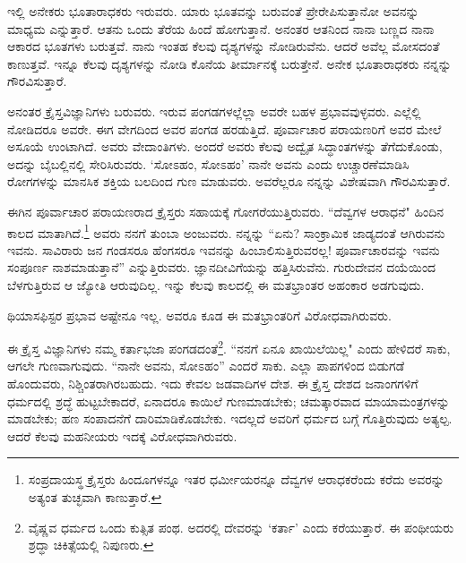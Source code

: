 \vspace{0.13cm}

ಇಲ್ಲಿ ಅನೇಕರು ಭೂತಾರಾಧಕರು ಇರುವರು. ಯಾರು ಭೂತವನ್ನು ಬರುವಂತೆ ಪ್ರೇರೇಪಿಸುತ್ತಾನೋ ಅವನನ್ನು ಮಾಧ್ಯಮ ಎನ್ನುತ್ತಾರೆ. ಆತನು ಒಂದು ತೆರೆಯ ಹಿಂದೆ ಹೋಗುತ್ತಾನೆ. ಅನಂತರ ಆತನಿಂದ ನಾನಾ ಬಣ್ಣದ ನಾನಾ ಆಕಾರದ ಭೂತಗಳು ಬರುತ್ತವೆ. ನಾನು ಇಂತಹ ಕೆಲವು ದೃಶ್ಯಗಳನ್ನು ನೋಡಿರುವೆನು. ಆದರೆ ಅವೆಲ್ಲ ಮೋಸದಂತೆ ಕಾಣುತ್ತವೆ. ಇನ್ನೂ ಕೆಲವು ದೃಶ್ಯಗಳನ್ನು ನೋಡಿ ಕೊನೆಯ ತೀರ್ಮಾನಕ್ಕೆ ಬರುತ್ತೇನೆ. ಅನೇಕ ಭೂತಾರಾಧಕರು ನನ್ನನ್ನು ಗೌರವಿಸುತ್ತಾರೆ.

\vspace{0.13cm}

ಅನಂತರ ಕ್ರೈಸ್ತವಿಜ್ಞಾನಿಗಳು ಬರುವರು. ಇರುವ ಪಂಗಡಗಳಲ್ಲೆಲ್ಲಾ ಅವರೇ ಬಹಳ ಪ್ರಭಾವವುಳ್ಳವರು. ಎಲ್ಲೆಲ್ಲಿ ನೋಡಿದರೂ ಅವರೇ. ಈಗ ವೇಗದಿಂದ ಅವರ ಪಂಗಡ ಹರಡುತ್ತಿದೆ. ಪೂರ್ವಾಚಾರ ಪರಾಯಣರಿಗೆ ಅವರ ಮೇಲೆ ಅಸೂಯೆ ಉಂಟಾಗಿದೆ. ಅವರು ವೇದಾಂತಿಗಳು. ಅಂದರೆ ಅವರು ಕೆಲವು ಅದ್ವೈತ ಸಿದ್ಧಾಂತಗಳನ್ನು ತೆಗೆದುಕೊಂಡು, ಅದನ್ನು ಬೈಬಲ್ಲಿನಲ್ಲಿ ಸೇರಿಸಿರುವರು. `ಸೋಽಹಂ, ಸೋಽಹಂ' \enginline{-} ನಾನೇ ಅವನು \enginline{-} ಎಂದು ಉಚ್ಚಾರಣೆಮಾಡಿಸಿ ರೋಗಗಳನ್ನು ಮಾನಸಿಕ ಶಕ್ತಿಯ ಬಲದಿಂದ ಗುಣ ಮಾಡುವರು. ಅವರೆಲ್ಲರೂ ನನ್ನನ್ನು ವಿಶೇಷವಾಗಿ ಗೌರವಿಸುತ್ತಾರೆ.

\vspace{0.13cm}

ಈಗಿನ ಪೂರ್ವಾಚಾರ ಪರಾಯಣರಾದ ಕ್ರೈಸ್ತರು ಸಹಾಯಕ್ಕೆ ಗೋಗರೆಯುತ್ತಿರುವರು. ``ದೆವ್ವಗಳ ಆರಾಧನೆ" ಹಿಂದಿನ ಕಾಲದ ಮಾತಾಗಿದೆ.\footnote{ಸಂಪ್ರದಾಯಸ್ಥ ಕ್ರೈಸ್ತರು ಹಿಂದೂಗಳನ್ನೂ ಇತರ ಧರ್ಮೀಯರನ್ನೂ ದೆವ್ವಗಳ ಆರಾಧಕರೆಂದು ಕರೆದು ಅವರನ್ನು ಅತ್ಯಂತ ತುಚ್ಛವಾಗಿ ಕಾಣುತ್ತಾರೆ.} ಅವರು ನನಗೆ ತುಂಬಾ ಅಂಜುವರು. ನನ್ನನ್ನು “ಏನು? ಸಾಂಕ್ರಾಮಿಕ ಜಾಡ್ಯದಂತೆ ಆಗಿರುವನು ಇವನು. ಸಾವಿರಾರು ಜನ ಗಂಡಸರೂ ಹೆಂಗಸರೂ ಇವನನ್ನು ಹಿಂಬಾಲಿಸುತ್ತಿರುವರಲ್ಲ! ಪೂರ್ವಾಚಾರವನ್ನು ಇವನು ಸಂಪೂರ್ಣ ನಾಶಮಾಡುತ್ತಾನೆ'' ಎನ್ನುತ್ತಿರುವರು. ಜ್ಞಾನದೀವಿಗೆಯನ್ನು ಹತ್ತಿಸಿರುವೆನು. ಗುರುದೇವನ ದಯೆಯಿಂದ ಬೆಳಗುತ್ತಿರುವ ಆ ಜ್ಯೋತಿ ಆರುವುದಿಲ್ಲ. ಇನ್ನು 
ಕೆಲವು ಕಾಲದಲ್ಲಿ ಈ ಮತಭ್ರಾಂತರ ಅಹಂಕಾರ ಅಡಗುವುದು.

\vspace{0.13cm}

ಥಿಯಾಸಫಿಸ್ಟರ ಪ್ರಭಾವ ಅಷ್ಟೇನೂ ಇಲ್ಲ. ಅವರೂ ಕೂಡ ಈ ಮತಭ್ರಾಂತರಿಗೆ ವಿರೋಧವಾಗಿರುವರು.

\newpage

ಈ ಕ್ರೈಸ್ತ ವಿಜ್ಞಾನಿಗಳು ನಮ್ಮ ಕರ್ತಾಭಜಾ ಪಂಗಡದಂತೆ\footnote{ವೈಷ್ಣವ ಧರ್ಮದ ಒಂದು ಕುತ್ಸಿತ ಪಂಥ. ಅದರಲ್ಲಿ ದೇವರನ್ನು `ಕರ್ತಾ' ಎಂದು ಕರೆಯುತ್ತಾರೆ. ಈ ಪಂಥೀಯರು ಶ್ರದ್ಧಾ \enginline{-} ಚಿಕಿತ್ಸೆಯಲ್ಲಿ ನಿಪುಣರು.}. “ನನಗೆ ಏನೂ ಖಾಯಿಲೆಯಿಲ್ಲ" ಎಂದು ಹೇಳಿದರೆ ಸಾಕು, ಆಗಲೇ ಗುಣವಾಗುವುದು. ``ನಾನೇ ಅವನು, ಸೋಽಹಂ'' ಎಂದರೆ ಸಾಕು. ಎಲ್ಲಾ ಪಾಪಗಳಿಂದ ಬಿಡುಗಡೆ ಹೊಂದುವರು, ನಿಶ್ಚಿಂತರಾಗಿರಬಹುದು. ಇದು ಕೇವಲ ಜಡವಾದಿಗಳ ದೇಶ. ಈ ಕ್ರೈಸ್ತ ದೇಶದ ಜನಾಂಗಗಳಿಗೆ ಧರ್ಮದಲ್ಲಿ ಶ್ರದ್ಧೆ ಹುಟ್ಟಬೇಕಾದರೆ, ಏನಾದರೂ ಕಾಯಿಲೆ ಗುಣಮಾಡಬೇಕು; ಚಮತ್ಕಾರವಾದ ಮಾಯಾಮಂತ್ರಗಳನ್ನು ಮಾಡಬೇಕು; ಹಣ ಸಂಪಾದನೆಗೆ ದಾರಿಮಾಡಿಕೊಡಬೇಕು. ಇದಲ್ಲದೆ ಅವರಿಗೆ ಧರ್ಮದ ಬಗ್ಗೆ ಗೊತ್ತಿರುವುದು ಅತ್ಯಲ್ಪ. ಆದರೆ ಕೆಲವು ಮಹನೀಯರು ಇದಕ್ಕೆ ವಿರೋಧವಾಗಿರುವರು.

